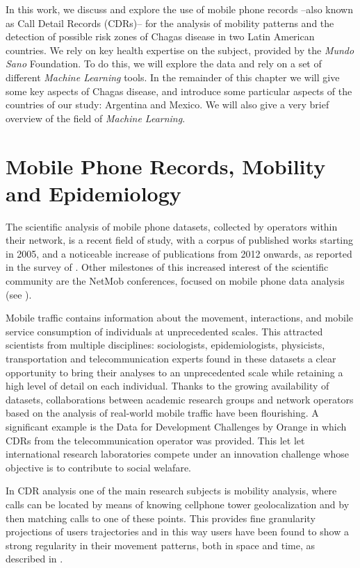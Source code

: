 In this work, we discuss and explore the use of mobile phone records --also known as Call Detail Records (CDRs)-- for the analysis of mobility patterns and the detection of possible risk zones of Chagas disease in two Latin American countries.
We rely on key health expertise on the subject, provided by the \textit{Mundo Sano} Foundation.
To do this, we will explore the data and rely on a set of different \textit{Machine Learning} tools.
In the remainder of this chapter we will give some key aspects of Chagas disease, and introduce some particular aspects of the countries of our study: Argentina and Mexico.
We will also give a very brief overview of the field of \textit{Machine Learning}.


\section{Mobile Phone Records, Mobility and Epidemiology}

The scientific analysis of mobile phone datasets, collected by operators within their network, is a recent field of study, with a corpus of published works starting in 2005, and a noticeable increase of publications from 2012 onwards, as reported in the survey of \citep{naboulsi2015mobile}.
Other milestones of this increased interest of the scientific community are the NetMob conferences, focused on mobile phone data analysis (see \citep{netmob}).

Mobile traffic contains information about the movement, interactions, and mobile service consumption of individuals at unprecedented scales.
This attracted scientists from multiple disciplines:
sociologists, epidemiologists, physicists, transportation and telecommunication experts found in these datasets a clear opportunity to bring their analyses to an unprecedented scale while retaining a high level of detail on each individual.
Thanks to the growing availability of datasets, collaborations between academic research groups and network operators based on the analysis of real-world mobile traffic have been flourishing.
A significant example is the Data for Development Challenges by Orange \citep{d4d} in which CDRs from the telecommunication operator was provided.
This let let international research laboratories compete under an innovation challenge whose objective is to contribute to social welafare.

In CDR analysis one of the main research subjects is mobility analysis, where calls can be located by means of knowing cellphone tower geolocalization and by then matching calls to one of these points.
This provides fine granularity projections of users trajectories and in this way users have been found to show a strong regularity in their movement patterns, both in space and time, as described in \citep{gonzalez2008understanding}.


